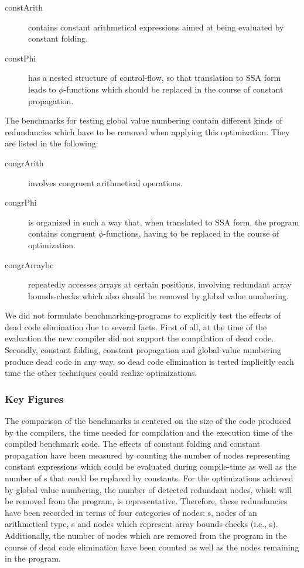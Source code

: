 \begin{description}
\item[constArith] contains constant arithmetical expressions aimed at being evaluated by constant folding.
\item[constPhi] has a nested structure of control-flow, so that translation to SSA form leads to $\phi$-functions which should be replaced in the course of constant propagation.
\end{description}

The benchmarks for testing global value numbering contain different kinds of redundancies which have to be removed when applying this optimization. They are listed in the following:

\begin{description}
\item[congrArith] involves congruent arithmetical operations.
\item[congrPhi] is organized in such a way that, when translated to SSA form, the program contains congruent $\phi$-functions, having to be replaced in the course of optimization.
\item[congrArraybc] repeatedly accesses arrays at certain positions, involving redundant array bounds-checks which also should be removed by global value numbering.
\end{description}

We did not formulate benchmarking-programs to explicitly test the effects of dead code elimination due to several facts. First of all, at the time of the evaluation the new compiler did not support the compilation of dead code. Secondly, constant folding, constant propagation and global value numbering produce dead code in any way, so dead code elimination is tested implicitly each time the other techniques could realize optimizations.

\subsubsection*{Key Figures}
\label{sec:evaluation:key-figures}
The comparison of the benchmarks is centered on the size of the code produced by the compilers, the time needed for compilation and the execution time of the compiled benchmark code. The effects of constant folding and constant propagation have been measured by counting the number of nodes representing constant expressions which could be evaluated during compile-time as well as the number of s that could be replaced by constants. For the optimizations achieved by global value numbering, the number of detected redundant nodes, which will be removed from the program, is representative. Therefore, these redundancies have been recorded in terms of four categories of nodes: s, nodes of an arithmetical type, s and nodes which represent array bounds-checks (i.e., s). Additionally, the number of nodes which are removed from the program in the course of dead code elimination have been counted as well as the nodes remaining in the program.

